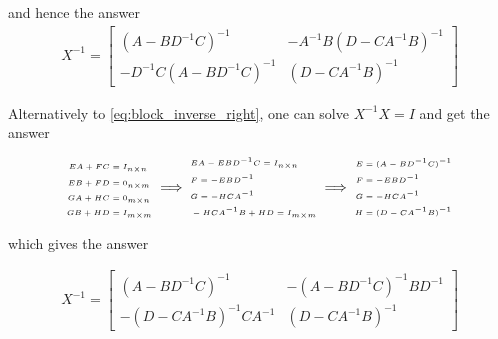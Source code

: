 and hence the answer
\begin{align}
	X^{-1} = \begin{bmatrix}
		(A - B D^{-1} C)^{-1} & -A^{-1} B (D - C A^{-1} B)^{-1} \\
		-D^{-1} C (A - B D^{-1} C)^{-1}  & (D - C A^{-1} B)^{-1}
	\end{bmatrix}
\end{align}

Alternatively to \autoref{eq:block_inverse_right}, one can solve $X^{-1} X = I$ and get the answer 

\begin{align*}
	\begin{tiny}
		\begin{aligned}
			E A + F C &= I_{n \times n} \\
			E B + F D &= 0_{n \times m} \\
			G A + H C &= 0_{m \times n} \\
			G B + H D &= I_{m \times m}
		\end{aligned}
		\implies
		\begin{aligned}
			&E A -E B D^{-1} C = I_{n \times n} \\
			&F = -E B D^{-1} \\
			&G = - H C A^{-1} \\
			&- H C A^{-1} B + H D = I_{m \times m}
		\end{aligned}
\implies
		\begin{aligned}
			E &= (A - B D^{-1} C)^{-1} \\
			F &= -E B D^{-1} \\
			G &= - H C A^{-1} \\
			H &= (D - C A^{-1} B)^{-1}
		\end{aligned}
	\end{tiny}
\end{align*}

which gives the answer

\begin{align}
	X^{-1} = \begin{bmatrix}
		(A - B D^{-1} C)^{-1} & -(A - B D^{-1} C)^{-1} B D^{-1} \\
		-(D - C A^{-1} B)^{-1} C A^{-1}  & (D - C A^{-1} B)^{-1}
	\end{bmatrix}
\end{align}
